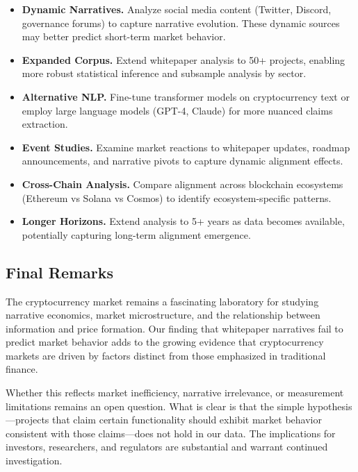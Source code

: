 \documentclass[11pt,twocolumn]{article}
\begin{document}
\begin{itemize}
    \item \textbf{Dynamic Narratives.} Analyze social media content (Twitter, Discord, governance forums) to capture narrative evolution. These dynamic sources may better predict short-term market behavior.

    \item \textbf{Expanded Corpus.} Extend whitepaper analysis to 50+ projects, enabling more robust statistical inference and subsample analysis by sector.

    \item \textbf{Alternative NLP.} Fine-tune transformer models on cryptocurrency text or employ large language models (GPT-4, Claude) for more nuanced claims extraction.

    \item \textbf{Event Studies.} Examine market reactions to whitepaper updates, roadmap announcements, and narrative pivots to capture dynamic alignment effects.

    \item \textbf{Cross-Chain Analysis.} Compare alignment across blockchain ecosystems (Ethereum vs Solana vs Cosmos) to identify ecosystem-specific patterns.

    \item \textbf{Longer Horizons.} Extend analysis to 5+ years as data becomes available, potentially capturing long-term alignment emergence.
\end{itemize}

\subsection{Final Remarks}

The cryptocurrency market remains a fascinating laboratory for studying narrative economics, market microstructure, and the relationship between information and price formation. Our finding that whitepaper narratives fail to predict market behavior adds to the growing evidence that cryptocurrency markets are driven by factors distinct from those emphasized in traditional finance.

Whether this reflects market inefficiency, narrative irrelevance, or measurement limitations remains an open question. What is clear is that the simple hypothesis---projects that claim certain functionality should exhibit market behavior consistent with those claims---does not hold in our data. The implications for investors, researchers, and regulators are substantial and warrant continued investigation.
\end{document}
